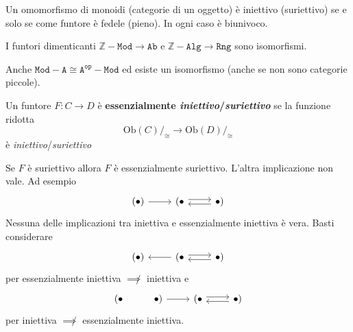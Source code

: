 \begin{example}{}
    Un omomorfismo di monoidi (categorie di un oggetto) è iniettivo (suriettivo)
    se e solo se come funtore è fedele (pieno). In ogni caso è biunivoco.
\end{example}

\begin{example}{}
    I funtori dimenticanti \(\mathtt{\mathbb{Z}-Mod} \to \mathtt{Ab}\) e \(\mathtt{\mathbb{Z}-Alg} \to \mathtt{Rng}\) sono isomorfismi.
\end{example}

\begin{example}{}
    Anche \(\mathtt{Mod-A}\cong \mathtt{A^{op}-Mod}\) ed esiste un isomorfismo
    (anche se non sono categorie piccole).
\end{example}

\begin{definition}{}
    Un funtore \(F: C \to D\) è \textbf{essenzialmente
    \emph{iniettivo}/\emph{suriettivo}} se la funzione ridotta 
    \[
        \mathrm{Ob}{(C)}/_{\cong} \to \mathrm{Ob}{(D)}/_{\cong}
    \]
    è \emph{iniettivo}/\emph{suriettivo}
\end{definition}

\begin{remark}{}
    Se \(F\) è suriettivo allora \(F\) è essenzialmente suriettivo. L'altra
    implicazione non vale. Ad esempio
\[\begin{tikzcd}
	{(\bullet)} & {(\bullet} & {\bullet)}
	\arrow[from=1-1, to=1-2]
	\arrow[shift left, from=1-2, to=1-3]
	\arrow[shift left, from=1-3, to=1-2]
\end{tikzcd}\]
    Nessuna delle implicazioni tra iniettiva e essenzialmente iniettiva è vera.
    Basti considerare
\[\begin{tikzcd}
	{(\bullet)} & {(\bullet} & {\bullet)}
	\arrow[from=1-2, to=1-1]
	\arrow[shift left, from=1-2, to=1-3]
	\arrow[shift left, from=1-3, to=1-2]
\end{tikzcd}\]
    per essenzialmente iniettiva \(\not\implies\) iniettiva
    e
\[\begin{tikzcd}
	{(\bullet} & {\bullet)} & {(\bullet} & {\bullet)}
	\arrow[from=1-2, to=1-3]
	\arrow[shift left, from=1-3, to=1-4]
	\arrow[shift left, from=1-4, to=1-3]
\end{tikzcd}\]
    per iniettiva \(\not\implies \) essenzialmente iniettiva.
\end{remark}

